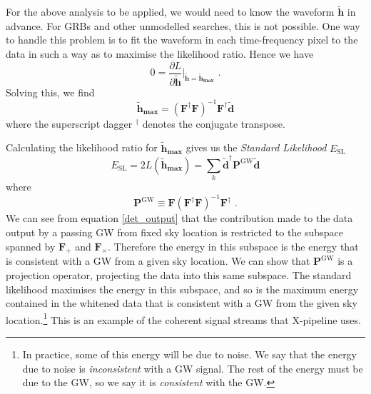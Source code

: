 \documentclass[11pt]{cuthesis}
\newcommand{\fs}{\text{ .}}
\newcommand{\tbd}{\tilde{\textbf{d}}}
\newcommand{\tbh}{\tilde{\textbf{h}}}
\newcommand{\xp}{X-pipeline }
\begin{document}
For the above analysis to be applied, we would need to know the waveform $\tbh$ in advance. For GRBs and other unmodelled searches, this is not possible. One way to handle this problem is to fit the waveform in each time-frequency pixel to the data in such a way as to maximise the likelihood ratio. Hence we have
\begin{equation}
0=\frac{\partial L}{\partial \tbh} \bigg|_{\tbh=\tbh_{\textbf{max}}} \fs
\end{equation} 
Solving this, we find
\begin{equation} 
\tbh_\textbf{max}=(\textbf{F}^\dagger \textbf{F} )^{-1} \textbf{F}^\dagger \tbd
\end{equation}
where the superscript dagger $^\dagger$ denotes the conjugate transpose. 

Calculating the likelihood ratio for $\tbh_\textbf{max}$ gives us the \emph{Standard Likelihood} $E_\text{SL}$
\begin{equation} \label{Esl}
E_\text{SL}=2L(\tbh_\textbf{max} )=\sum_k \tbd^\dagger \textbf{P}^\text{GW} \tbd
\end{equation}
where 
\begin{equation} \label{projOp1}
\textbf{P}^\text{GW} \equiv \textbf{F} (\textbf{F}^\dagger \textbf{F})^{-1} \textbf{F}^\dagger \fs
\end{equation}
We can see from equation \ref{det_output} that the contribution made to the data output by a passing GW from fixed sky location is restricted to the subspace spanned by $\textbf{F}_+$ and $\textbf{F}_\times$. Therefore the energy in this subspace is the energy that is consistent with a GW from a given sky location. We can show that $\textbf{P}^\text{GW} $ is a projection operator, projecting the data into this same subspace. The standard likelihood maximises the energy in this subspace, and so is the maximum energy contained in the whitened data that is consistent with a GW from the given sky location.\footnote{In practice, some of this energy will be due to noise. We say that the energy due to noise is \emph{inconsistent} with a GW signal. The rest of the energy must be due to the GW, so we say it is \emph{consistent} with the GW.} This is an example of the coherent signal streams that \xp uses.
\end{document}
